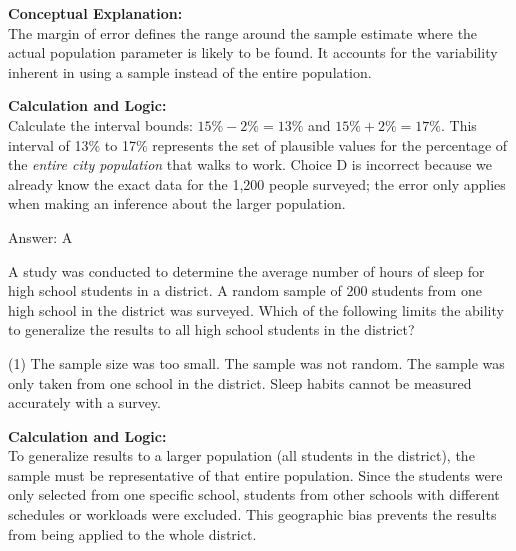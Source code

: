 \documentclass[11pt,paper=a4,answers]{exam}
\begin{document}
\begin{questions}
\begin{solution}
\textbf{Conceptual Explanation:} \\
The margin of error defines the range around the sample estimate where the actual population parameter is likely to be found. It accounts for the variability inherent in using a sample instead of the entire population.

\vspace{30pt}

\textbf{Calculation and Logic:} \\
Calculate the interval bounds: $15\% - 2\% = 13\%$ and $15\% + 2\% = 17\%$. This interval of 13\% to 17\% represents the set of plausible values for the percentage of the \textit{entire city population} that walks to work. Choice D is incorrect because we already know the exact data for the 1,200 people surveyed; the error only applies when making an inference about the larger population.

\vspace{30pt}

Answer: \colorbox{yellow!100}{A}
\end{solution}

\vspace{60pt}

\question
A study was conducted to determine the average number of hours of sleep for high school students in a district. A random sample of 200 students from one high school in the district was surveyed. Which of the following limits the ability to generalize the results to all high school students in the district?
\begin{tasks}(1)
    \task The sample size was too small.
    \task The sample was not random.
    \task The sample was only taken from one school in the district.
    \task Sleep habits cannot be measured accurately with a survey.
\end{tasks}

\begin{solution}
\textbf{Calculation and Logic:} \\
To generalize results to a larger population (all students in the district), the sample must be representative of that entire population. Since the students were only selected from one specific school, students from other schools with different schedules or workloads were excluded. This geographic bias prevents the results from being applied to the whole district.


\end{solution}
\end{questions}
\end{document}
